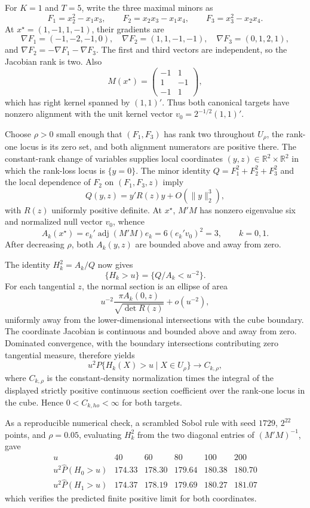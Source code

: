 For \(K=1\) and \(T=5\), write the three maximal minors as
\[
F_1=x_2^2-x_1x_3,\qquad
F_2=x_2x_3-x_1x_4,\qquad
F_3=x_3^2-x_2x_4.
\]
At \(x^\star=(1,-1,1,-1)\), their gradients are
\[
\nabla F_1=(-1,-2,-1,0),\quad
\nabla F_2=(1,1,-1,-1),\quad
\nabla F_3=(0,1,2,1),
\]
and \(\nabla F_2=-\nabla F_1-\nabla F_3\). The first and third vectors are independent, so the Jacobian rank is two. Also
\[
M(x^\star)=
\begin{pmatrix}-1&1\\1&-1\\-1&1\end{pmatrix},
\]
which has right kernel spanned by \((1,1)'\). Thus both canonical targets have nonzero alignment with the unit kernel vector \(v_0=2^{-1/2}(1,1)'\).

Choose \(\rho>0\) small enough that \((F_1,F_3)\) has rank two throughout \(U_\rho\), the rank-one locus is its zero set, and both alignment numerators are positive there. The constant-rank change of variables supplies local coordinates \((y,z)\in\mathbb R^2\times\mathbb R^2\) in which the rank-loss locus is \(\{y=0\}\). The minor identity \(Q=F_1^2+F_2^2+F_3^2\) and the local dependence of \(F_2\) on \((F_1,F_3,z)\) imply
\[
Q(y,z)=y'R(z)y+O(\|y\|_2^3),
\]
with \(R(z)\) uniformly positive definite. At \(x^\star\), \(M'M\) has nonzero eigenvalue six and normalized null vector \(v_0\), whence
\[
A_k(x^\star)=e_k'\operatorname{adj}(M'M)e_k
=6(e_k'v_0)^2=3,
\qquad k=0,1.
\]
After decreasing \(\rho\), both \(A_k(y,z)\) are bounded above and away from zero.

The identity \(H_k^2=A_k/Q\) now gives
\[
\{H_k>u\}=\{Q/A_k<u^{-2}\}.
\]
For each tangential \(z\), the normal section is an ellipse of area
\[
u^{-2}\frac{\pi A_k(0,z)}{\sqrt{\det R(z)}}+o(u^{-2}),
\]
uniformly away from the lower-dimensional intersections with the cube boundary. The coordinate Jacobian is continuous and bounded above and away from zero. Dominated convergence, with the boundary intersections contributing zero tangential measure, therefore yields
\[
u^2P\{H_k(X)>u\mid X\in U_\rho\}
\longrightarrow
C_{k,\rho},
\]
where \(C_{k,\rho}\) is the constant-density normalization times the integral of the displayed strictly positive continuous section coefficient over the rank-one locus in the cube. Hence \(0<C_{k,
ho}<\infty\) for both targets.

As a reproducible numerical check, a scrambled Sobol rule with seed \(1729\), \(2^{22}\) points, and \(\rho=0.05\), evaluating \(H_k^2\) from the two diagonal entries of \((M'M)^{-1}\), gave
\[
\begin{array}{c|rrrrr}
u&40&60&80&100&200\\ \hline
u^2\widehat P(H_0>u)&174.33&178.30&179.64&180.38&180.70\\
u^2\widehat P(H_1>u)&174.37&178.19&179.69&180.27&181.07
\end{array}
\]
which verifies the predicted finite positive limit for both coordinates.


